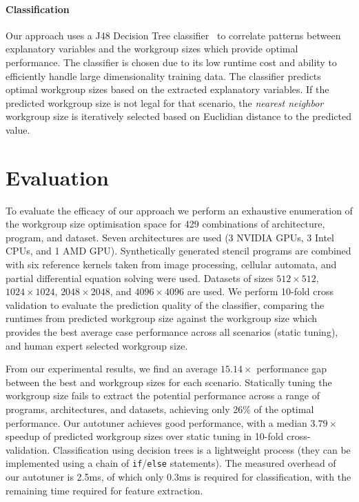 \documentclass[hidelinks]{acaces}
\begin{document}
\paragraph{Classification} Our approach uses a J48 Decision Tree
classifier~\cite{Han2011} to correlate patterns between explanatory
variables and the workgroup sizes which provide optimal
performance. The classifier is chosen due to its low runtime cost and
ability to efficiently handle large dimensionality training data. The
classifier predicts optimal workgroup sizes based on the extracted
explanatory variables. If the predicted workgroup size is not legal
for that scenario, the \emph{nearest neighbor} workgroup size is
iteratively selected based on Euclidian distance to the predicted
value.

\section{Evaluation}

To evaluate the efficacy of our approach we perform an exhaustive
enumeration of the workgroup size optimisation space for 429
combinations of architecture, program, and dataset. Seven
architectures are used (3 NVIDIA GPUs, 3 Intel CPUs, and 1 AMD
GPU). Synthetically generated stencil programs are combined with six
reference kernels taken from image processing, cellular automata, and
partial differential equation solving were used. Datasets of sizes
$512\times512$, $1024\times1024$, $2048\times2048$, and
$4096\times4096$ are used. We perform 10-fold cross validation to
evaluate the prediction quality of the classifier, comparing the
runtimes from predicted workgroup size against the workgroup size
which provides the best average case performance across all scenarios
(static tuning), and human expert selected workgroup size.


From our experimental results, we find an average $15.14\times$
performance gap between the best and workgroup sizes for each
scenario. Statically tuning the workgroup size fails to extract the
potential performance across a range of programs, architectures, and
datasets, achieving only 26\% of the optimal performance. Our
autotuner achieves good performance, with a median $3.79\times$
speedup of predicted workgroup sizes over static tuning in 10-fold
cross-validation. Classification using decision trees is a lightweight
process (they can be implemented using a chain of
\texttt{if}/\texttt{else} statements). The measured overhead of our
autotuner is 2.5ms, of which only 0.3ms is required for
classification, with the remaining time required for feature
extraction.
\end{document}

